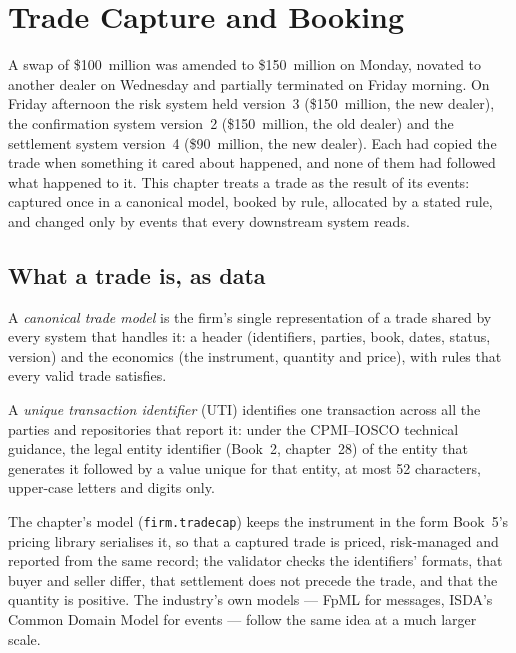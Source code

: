 \chapter{Trade Capture and Booking}\label{ch:pl:trade-capture-and-booking}

A swap of \$100~million was amended to \$150~million on Monday, novated to another dealer on Wednesday and partially terminated on Friday
morning. On Friday afternoon the risk system held version~3 (\$150~million, the new dealer), the confirmation system version~2 (\$150~million,
the old dealer) and the settlement system version~4 (\$90~million, the new dealer). Each had copied the trade when something it cared about
happened, and none of them had followed what happened to it. This chapter treats a trade as the result of its events: captured once in a
canonical model, booked by rule, allocated by a stated rule, and changed only by events that every downstream system reads.

\section{What a trade is, as data}

\begin{definition}\label{def:pl:trade-capture-and-booking:canonical}
A \emph{canonical trade model} is the firm's single representation of a trade shared by every system that
handles it: a header (identifiers, parties, book, dates, status, version) and the economics (the instrument, quantity and price), with
rules that every valid trade satisfies.
\end{definition}

\begin{definition}\label{def:pl:trade-capture-and-booking:uti}
A \emph{unique transaction identifier} (UTI) identifies one transaction across all the parties and
repositories that report it: under the CPMI--IOSCO technical guidance, the legal entity identifier (Book~2, chapter~28) of the entity that
generates it followed by a value unique for that entity, at most 52 characters, upper-case letters and digits only.
\end{definition}

The chapter's model (\texttt{firm.tradecap}) keeps the instrument in the form Book~5's pricing library serialises it, so that a captured trade
is priced, risk-managed and reported from the same record; the validator checks the identifiers' formats, that buyer and seller differ, that
settlement does not precede the trade, and that the quantity is positive. The industry's own models --- FpML for messages, ISDA's Common Domain
Model for events --- follow the same idea at a much larger scale.

